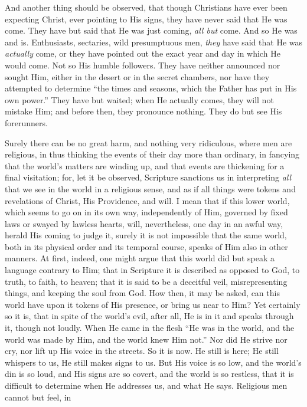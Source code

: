 And another thing should be observed, that though Christians have
ever been expecting Christ, ever pointing to His signs, they have
never said that He was come. They have but said that He was just
coming, \emph{all but} come. And so He was and is. Enthusiasts,
sectaries, wild presumptuous men, \emph{they} have said that He was \emph{actually}
come, or they have pointed out the exact year and day in which He
would come. Not so His humble followers. They have neither announced
nor sought Him, either in the desert or in the secret chambers, nor
have they attempted to determine ``the times and seasons, which
the Father has put in His own power.'' They have but waited; when
He actually comes, they will not mistake Him; and before then, they
pronounce nothing. They do but see His forerunners.

Surely there can be no great harm, and nothing very ridiculous,
where men are religious, in thus thinking the events of their day more
than ordinary, in fancying that the world's matters are winding up,
and that events are thickening for a final visitation; for, let it be
observed, Scripture sanctions us in interpreting \emph{all} that we
see in the world in a religious sense, and as if all things were
tokens and revelations of Christ, His Providence, and will. I mean that
if this lower world, which seems to go on in its own way,
independently of Him, governed by fixed laws or swayed by lawless
hearts, will, nevertheless, one day in an awful way, herald His coming
to judge it, surely it is not impossible that the same world, both in
its physical order and its temporal course, speaks of Him also in
other manners. At first, indeed, one might argue that this world did
but speak a language contrary to Him; that in Scripture it is
described as opposed to God, to truth, to faith, to heaven; that it is
said to be a deceitful veil, misrepresenting things, and keeping the
soul from God. How then, it may be asked, can this world have upon it
tokens of His presence, or bring us near to Him? Yet certainly so it
is, that in spite of the world's evil, after all, He is in it and
speaks through it, though not loudly. When He came in the flesh
``He was in the world, and the world was made by Him, and the
world knew Him not.'' Nor did He strive nor cry, nor lift up His
voice in the streets. So it is now. He still is here; He still
whispers to us, He still makes signs to us. But His voice is so low,
and the world's din is so loud, and His signs are so covert, and the
world is so restless, that it is difficult to determine when He
addresses us, and what He says. Religious men cannot but feel, in
